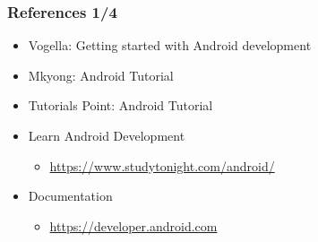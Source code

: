 \documentclass[10pt,xcolor=pdflatex]{beamer}
\begin{document}
\begin{frame}[fragile]\frametitle{References 1/4}
\begin{itemize}
	\item Vogella: Getting started with Android development
      \begin{itemize}
      \end{itemize}
    \item Mkyong: Android Tutorial
      \begin{itemize}
      \end{itemize}
    \item Tutorials Point: Android Tutorial
      \begin{itemize}
      \end{itemize}
    \item Learn Android Development
      \begin{itemize}
        \item \url{https://www.studytonight.com/android/}
      \end{itemize}
    \item Documentation
      \begin{itemize}
        \item \url{https://developer.android.com}
      \end{itemize}
\end{itemize}
\end{frame}
\end{document}

